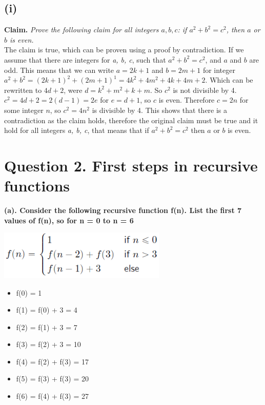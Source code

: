 \documentclass[a4paper]{article}
\begin{document}
\subsection{(i)} 
\textbf{Claim.} \textit{Prove the following claim for all integers $a,b,c$: if $a^2 + b^2 = c^2$, then $a$ or $b$ is even.}\\
The claim is true, which can be proven using a proof by contradiction.
If we assume that there are integers for \textit{a, b, c}, such that $a^2 + b^2 = c^2$, and $a$ and $b$ are odd.
This means that we can write $a = 2k + 1$ and $b = 2m + 1$ for integer $a^2 + b^2 = (2k+1)^2 + (2m+1)^1 = 4k^2 + 4m^2 + 4k + 4m + 2$.
Which can be rewritten to $4d + 2$, were $d = k^2 + m^2 + k + m$.
So $c^2$ is not divisible by 4.
$c^2 = 4d + 2 = 2(d - 1) = 2e $ for $e = d + 1$, so $c$ is even.
Therefore $c = 2n$ for some integer $n$, so $c^2 = 4n^2$ is divisible by 4.
This shows that there is a contradiction as the claim holds, therefore the original claim must be true and it hold for all integers \textit{a, b, c}, that means that if $a^2 + b^2 = c^2$ then $a$ or $b$ is even.




\newpage
\section{Question 2. First steps in recursive functions}
\textbf{(a). Consider the following recursive function f(n). List the first 7 values of f(n), so for n = 0 to n = 6}
\begin{center}
    \includegraphics[width=0.6\textwidth]{images/2a.png}\\[1cm]
\end{center}

\begin{itemize}
    \item f(0) = 1
    \item f(1) = f(0) + 3 = 4
    \item f(2) = f(1) + 3 = 7
    \item f(3) = f(2) + 3 = 10
    \item f(4) = f(2) + f(3) = 17
    \item f(5) = f(3) + f(3) = 20
    \item f(6) = f(4) + f(3) = 27
\end{itemize}
\ \\
\end{document}

